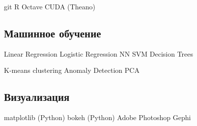 \documentclass[a4paper]{resume}
\begin{document}
\begin{minipage}[t]{0.35\textwidth} {\Large }
git \textbullet{}  R \textbullet{} Octave \textbullet{} CUDA (Theano)

\sectionspace


\subsection{Машинное обучение}
Linear Regression\textbullet{} Logistic Regression\textbullet{} NN\textbullet{} SVM\textbullet{} Decision Trees


K-means clustering \textbullet{} Anomaly Detection \textbullet{} PCA

\sectionspace 



\subsection{Визуализация}
matplotlib (Python) \textbullet{} bokeh (Python) \textbullet{} Adobe Photoshop \textbullet{} Gephi
\sectionspace



\end{minipage} {\Large }%
\hfill
%
%
\end{document}
